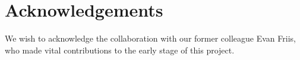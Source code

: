 \section*{Acknowledgements}

We wish to acknowledge the collaboration with our former colleague Evan Friis,
who made vital contributions to the early stage of this project.